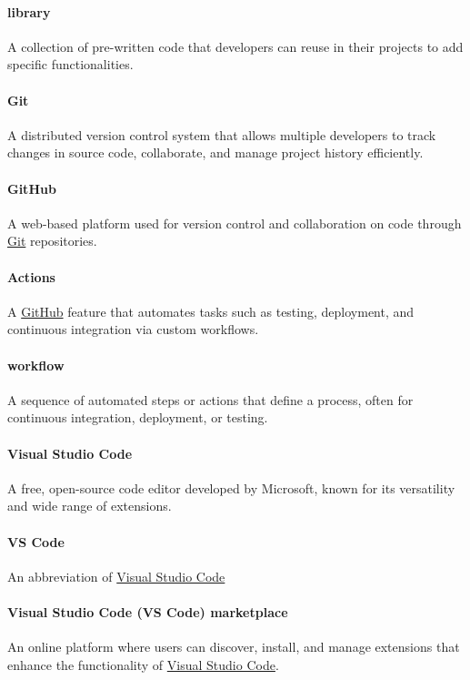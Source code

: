 \documentclass[12pt]{article}
\begin{document}
\paragraph*{library}
A collection of pre-written code that developers can reuse in their
projects to add specific functionalities.

\paragraph*{Git}
\label{term:git}
A distributed version control system that allows multiple developers
to track changes in source code, collaborate, and manage project
history efficiently.

\paragraph*{GitHub}
\label{term:GitH}
A web-based platform used for version control and collaboration on
code through \hyperref[term:git]{Git} repositories.

\paragraph*{Actions}
A \hyperref[term:GitH]{GitHub} feature that automates tasks such as
testing, deployment, and continuous integration via custom workflows.

\paragraph*{workflow}
A sequence of automated steps or actions that define a process, often
for continuous integration, deployment, or testing.

\paragraph*{Visual Studio Code}
\label{term:VSC}
A free, open-source code editor developed by Microsoft, known for its
versatility and wide range of extensions.

\paragraph*{VS Code}
An abbreviation of \hyperref[term:VSC]{Visual Studio Code}

\paragraph*{Visual Studio Code (VS Code) marketplace}
An online platform where users can discover, install, and manage
extensions that enhance the functionality of
\hyperref[term:VSC]{Visual Studio Code}.
\end{document}

